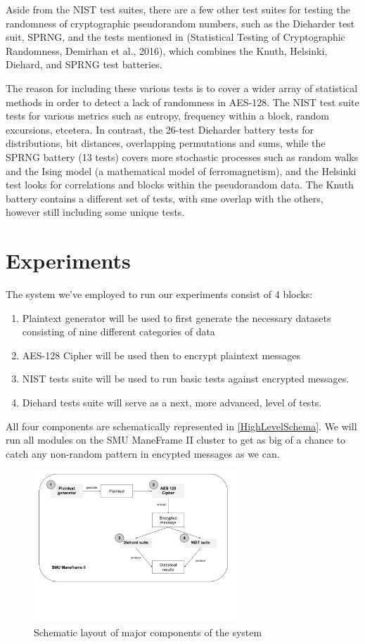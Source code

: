 \documentclass[conference]{IEEEtran}
\begin{document}
Aside from the NIST test suites, there are a few other test suites for testing the randomness of cryptographic pseudorandom numbers, such as the Dieharder test suit, SPRNG, and the tests mentioned in  (Statistical Testing of Cryptographic Randomness, Demirhan et al., 2016), which combines the Knuth, Helsinki, Diehard, and SPRNG test batteries.

The reason for including these various tests is to cover a wider array of statistical methods in order to detect a lack of randomness in AES-128. The NIST test suite tests for various metrics such as entropy, frequency within a block, random excursions, etcetera. In contrast, the 26-test Dieharder battery tests for distributions, bit distances, overlapping permutations and sums, while the SPRNG battery (13 tests) covers more stochastic processes such as random walks and the Ising model (a
mathematical model of ferromagnetism), and the Helsinki test looks for correlations and blocks within the pseudorandom data. The Knuth battery contains a different set of tests, with sme overlap with the others, however still including some unique tests. 

\section{Experiments}

The system we've employed to run our experiments consist of 4 blocks:

\begin{enumerate}
  \item Plaintext generator will be used to first generate the necessary datasets consisting of nine different categories of data
  \item AES-128 Cipher will be used then to encrypt plaintext messages
  \item NIST tests suite will be used to run basic tests against encrypted messages.
  \item Diehard tests suite will serve as a next, more advanced, level of tests. 
\end{enumerate}

All four components are schematically represented in \autoref{HighLevelSchema}. We will run all modules on the SMU ManeFrame II cluster to get as big of a chance to catch any non-random pattern in encypted messages as we can.

\begin{figure}[h]
\centering
\includegraphics[width=3in]{imgs/HighLevelSchema.png}
\caption{Schematic layout of major components of the system}
\label{HighLevelSchema}
\end{figure}
\end{document}
